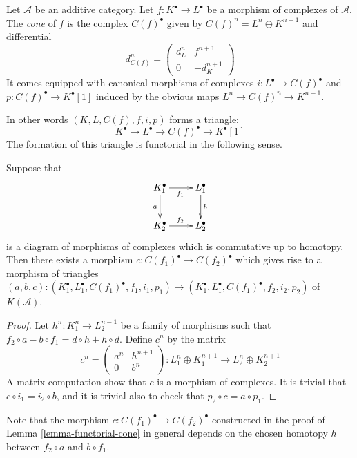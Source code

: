 \begin{definition}
\label{definition-cone}
Let $\mathcal{A}$ be an additive category.
Let $f : K^\bullet \to L^\bullet$ be a morphism of
complexes of $\mathcal{A}$. The {\it cone} of $f$
is the complex $C(f)^\bullet$ given by
$C(f)^n = L^n \oplus K^{n + 1}$ and
differential
$$
d_{C(f)}^n =
\left(
\begin{matrix}
d^n_L & f^{n + 1} \\
0 & -d_K^{n + 1}
\end{matrix}
\right)
$$
It comes equipped with canonical morphisms of complexes
$i : L^\bullet \to C(f)^\bullet$ and $p : C(f)^\bullet \to K^\bullet[1]$
induced by the obvious maps $L^n \to C(f)^n \to K^{n + 1}$.
\end{definition}

\noindent
In other words $(K, L, C(f), f, i, p)$ forms a triangle:
$$
K^\bullet \to L^\bullet \to C(f)^\bullet \to K^\bullet[1]
$$
The formation of this triangle is
functorial in the following sense.

\begin{lemma}
\label{lemma-functorial-cone}
Suppose that
$$
\xymatrix{
K_1^\bullet \ar[r]_{f_1} \ar[d]_a & L_1^\bullet \ar[d]^b \\
K_2^\bullet \ar[r]^{f_2} & L_2^\bullet
}
$$
is a diagram of morphisms of complexes which is commutative
up to homotopy. Then there exists a morphism
$c : C(f_1)^\bullet \to C(f_2)^\bullet$ which gives rise to
a morphism of triangles
$(a, b, c) : (K_1^\bullet, L_1^\bullet, C(f_1)^\bullet, f_1, i_1, p_1)
\to
(K_1^\bullet, L_1^\bullet, C(f_1)^\bullet, f_2, i_2, p_2)$
of $K(\mathcal{A})$.
\end{lemma}

\begin{proof}
Let $h^n : K_1^n \to L_2^{n - 1}$ be a family of morphisms such that
$f_2 \circ a - b \circ f_1 = d \circ h + h \circ d$.
Define $c^n$ by the matrix
$$
c^n =
\left(
\begin{matrix}
a^n & h^{n + 1} \\
0 & b^n
\end{matrix}
\right) :
L_1^n \oplus K_1^{n + 1} \to L_2^n \oplus K_2^{n + 1}
$$
A matrix computation show that $c$ is a morphism of complexes.
It is trivial that $c \circ i_1 = i_2 \circ b$, and it is
trivial also to check that $p_2 \circ c = a \circ p_1$.
\end{proof}

\noindent
Note that the morphism $c : C(f_1)^\bullet \to C(f_2)^\bullet$
constructed in the
proof of Lemma \ref{lemma-functorial-cone} in general depends on the
chosen homotopy $h$ between $f_2 \circ a$ and $b \circ f_1$.

